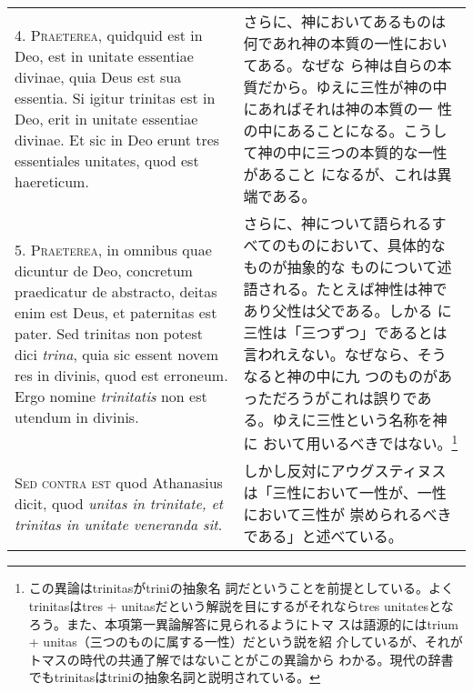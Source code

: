 \documentclass[10pt]{jsarticle} %
\begin{document}
\begin{longtable}{p{21em}p{21em}}
\\



4. {\scshape Praeterea}, quidquid est in Deo, est in unitate essentiae divinae, quia
Deus est sua essentia. Si igitur trinitas est in Deo, erit in unitate
essentiae divinae. Et sic in Deo erunt tres essentiales unitates, quod
est haereticum.


&

さらに、神においてあるものは何であれ神の本質の一性においてある。なぜな
 ら神は自らの本質だから。ゆえに三性が神の中にあればそれは神の本質の一
 性の中にあることになる。こうして神の中に三つの本質的な一性があること
 になるが、これは異端である。


\\



5. {\scshape Praeterea}, in omnibus quae dicuntur de Deo, concretum praedicatur de
abstracto, deitas enim est Deus, et paternitas est pater. Sed trinitas
non potest dici {\itshape trina}, quia sic essent novem res in divinis, quod est
erroneum. Ergo nomine {\itshape trinitatis} non est utendum in divinis.


&

さらに、神について語られるすべてのものにおいて、具体的なものが抽象的な
 ものについて述語される。たとえば神性は神であり父性は父である。しかる
 に三性は「三つずつ」であるとは言われえない。なぜなら、そうなると神の中に九
 つのものがあっただろうがこれは誤りである。ゆえに三性という名称を神に
 おいて用いるべきではない。\footnote{この異論はtrinitasがtriniの抽象名
 詞だということを前提としている。よくtrinitasはtres +
 unitasだという解説を目にするがそれならtres unitatesとなろう。また、本項第一異論解答に見られるようにトマ
 スは語源的にはtrium + unitas（三つのものに属する一性）だという説を紹
 介しているが、それがトマスの時代の共通了解ではないことがこの異論から
 わかる。現代の辞書でもtrinitasはtriniの抽象名詞と説明されている。}

\\



{\scshape Sed contra est} quod Athanasius dicit, quod {\itshape unitas in trinitate, et
trinitas in unitate veneranda sit}.


&

しかし反対にアウグスティヌスは「三性において一性が、一性において三性が
 崇められるべきである」と述べている。

\\




\end{longtable}
\end{document}
